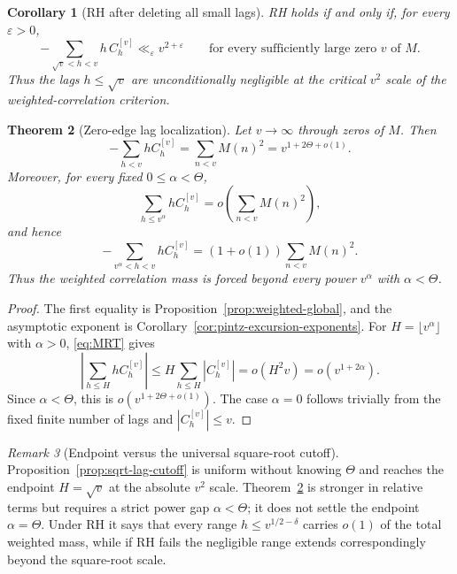 \documentclass[11pt]{amsart}
\numberwithin{equation}{section}
\theoremstyle{plain}
\newtheorem{theorem}{Theorem}[section]
\newtheorem{corollary}[theorem]{Corollary}
\theoremstyle{definition}
\theoremstyle{remark}
\newtheorem{remark}[theorem]{Remark}
\newcommand{\eps}{\varepsilon}
\begin{document}
\begin{corollary}[RH after deleting all small lags]
\label{cor:RH-large-lags}
RH holds if and only if, for every $\eps>0$,
\[
-\sum_{\sqrt v<h<v}h\,C_h^{[v]}\ll_\eps v^{2+\eps}
\qquad\text{for every sufficiently large zero $v$ of $M$.}
\]
Thus the lags $h\le\sqrt v$ are unconditionally negligible at the critical
$v^2$ scale of the weighted-correlation criterion.
\end{corollary}

\begin{theorem}[Zero-edge lag localization]
\label{thm:theta-lag-localization}
Let $v\to\infty$ through zeros of $M$.  Then
\begin{equation}
\label{eq:weighted-corr-exponent}
 -\sum_{h<v}hC_h^{[v]}
 =\sum_{n<v}M(n)^2
 =v^{1+2\Theta+o(1)}.
\end{equation}
Moreover, for every fixed $0\le\alpha<\Theta$,
\begin{equation}
\label{eq:theta-small-lags-negligible}
 \sum_{h\le v^\alpha}hC_h^{[v]}
 =o\!\left(\sum_{n<v}M(n)^2\right),
\end{equation}
and hence
\begin{equation}
\label{eq:theta-large-lag-mass}
 -\sum_{v^\alpha<h<v}hC_h^{[v]}
 =(1+o(1))\sum_{n<v}M(n)^2.
\end{equation}
Thus the weighted correlation mass is forced beyond every power
$v^\alpha$ with $\alpha<\Theta$.
\end{theorem}

\begin{proof}
The first equality is Proposition~\ref{prop:weighted-global}, and the
asymptotic exponent is Corollary~\ref{cor:pintz-excursion-exponents}.
For $H=\lfloor v^\alpha\rfloor$ with $\alpha>0$, \eqref{eq:MRT} gives
\[
 \left|\sum_{h\le H}hC_h^{[v]}\right|
 \le H\sum_{h\le H}|C_h^{[v]}|
 =o(H^2v)=o(v^{1+2\alpha}).
\]
Since $\alpha<\Theta$, this is $o(v^{1+2\Theta+o(1)})$.  The case
$\alpha=0$ follows trivially from the fixed finite number of lags and
$|C_h^{[v]}|\le v$.
\end{proof}

\begin{remark}[Endpoint versus the universal square-root cutoff]
\label{rem:theta-vs-sqrt-cutoff}
Proposition~\ref{prop:sqrt-lag-cutoff} is uniform without knowing $\Theta$
and reaches the endpoint $H=\sqrt v$ at the absolute $v^2$ scale.
Theorem~\ref{thm:theta-lag-localization} is stronger in relative terms but
requires a strict power gap $\alpha<\Theta$; it does not settle the endpoint
$\alpha=\Theta$.  Under RH it says that every range
$h\le v^{1/2-\delta}$ carries $o(1)$ of the total weighted mass, while if RH
fails the negligible range extends correspondingly beyond the square-root
scale.
\end{remark}
\end{document}
